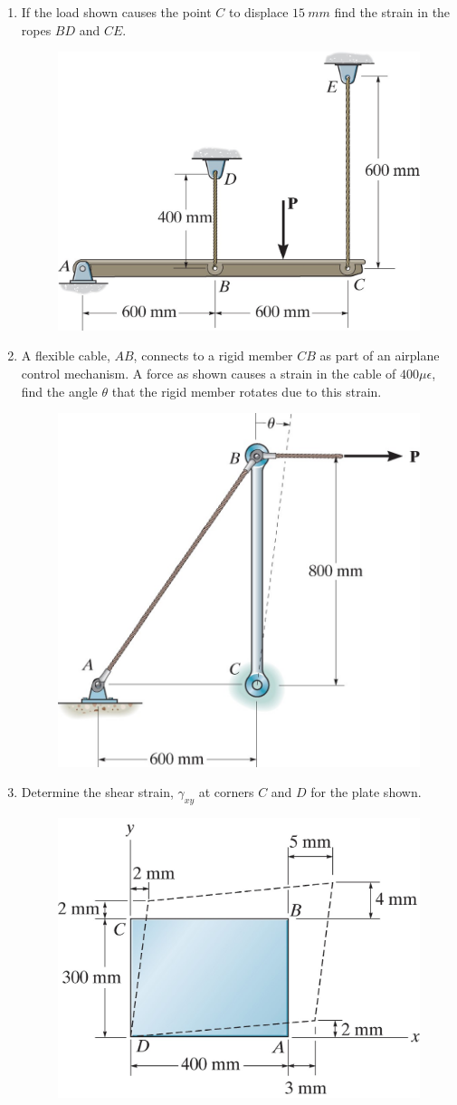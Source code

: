 \documentclass[12pt, oneside]{article}
\begin{document}
\begin{enumerate}
	\item %
		If the load shown causes the point $C$ to displace $\SI{15}{mm}$ find the strain in the ropes $BD$ and $CE$.
		\begin{figure}[H]
			\centering
			\includegraphics[width=0.5\linewidth]{tension1}
			\label{fig:tension1}
		\end{figure}

	\item %
		A flexible cable, $AB$, connects to a rigid member $CB$ as part of an airplane control mechanism.
		A force as shown causes a strain in the cable of $400 \mu \epsilon$, find the angle $\theta$ that the rigid member rotates due to this strain.
		\begin{figure}[H]
			\centering
			\includegraphics[width=0.5\linewidth]{tension2}
			\label{fig:tension2}
		\end{figure}

	\item %
		Determine the shear strain, $\gamma_{xy}$ at corners $C$ and $D$ for the plate shown.
		\begin{figure}[H]
			\centering
			\includegraphics[width=0.5\linewidth]{shear1}
			\label{fig:shear1}
		\end{figure}


\end{enumerate}
\end{document}
